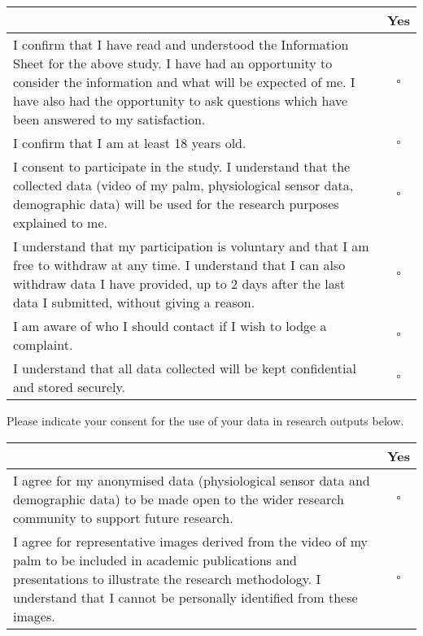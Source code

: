 \documentclass[12pt]{article}
\newcommand{\checkbox}{$\square$}
\begin{document}
\renewcommand{\arraystretch}{2.5}
\noindent
\begin{tabularx}{\textwidth}{|X|c|}
    \hline
    \textbf{} & \textbf{Yes} \\
    \hline
    I confirm that I have read and understood the Information Sheet for the above study. I have had an opportunity to consider the information and what will be expected of me. I have also had the opportunity to ask questions which have been answered to my satisfaction. & \checkbox \\
    \hline
    I confirm that I am at least 18 years old. & \checkbox \\
    \hline
    I consent to participate in the study. I understand that the collected data (video of my palm, physiological sensor data, demographic data) will be used for the research purposes explained to me. & \checkbox \\
    \hline
    I understand that my participation is voluntary and that I am free to withdraw at any time. I understand that I can also withdraw data I have provided, up to 2 days after the last data I submitted, without giving a reason. & \checkbox \\
    \hline
    I am aware of who I should contact if I wish to lodge a complaint. & \checkbox \\
    \hline
    I understand that all data collected will be kept confidential and stored securely. & \checkbox \\
    \hline
\end{tabularx}
\renewcommand{\arraystretch}{1}

\bigskip

\noindent Please indicate your consent for the use of your data in research outputs below.

\bigskip

\renewcommand{\arraystretch}{2.5}
\noindent
\begin{tabularx}{\textwidth}{|X|c|}
    \hline
    \textbf{} & \textbf{Yes}  \\
    \hline
    I agree for my anonymised data (physiological sensor data and demographic data) to be made open to the wider research community to support future research. & \checkbox \\
    \hline
    I agree for representative images derived from the video of my palm to be included in academic publications and presentations to illustrate the research methodology. I understand that I cannot be personally identified from these images. & \checkbox \\
    \hline
\end{tabularx}
\renewcommand{\arraystretch}{1}
\end{document}
